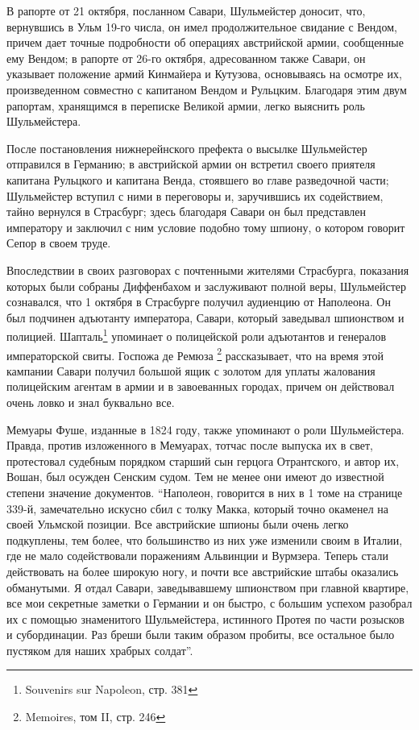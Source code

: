 \documentclass[
  oneside,
  12pt,
  titlepage]{book}
\begin{document}
В рапорте от 21 октября, посланном Савари, Шульмейстер доносит, что, вернувшись в Ульм 19-го числа, он имел продолжительное свидание с Вендом, причем дает точные подробности об операциях австрийской армии, сообщенные ему Вендом; в рапорте от 26-го октября, адресованном также Савари, он указывает положение армий Кинмайера и Кутузова, основываясь на осмотре их, произведенном совместно с капитаном Вендом и Рульцким. Благодаря этим двум рапортам, хранящимся в переписке Великой армии, легко выяснить роль Шульмейстера.

После постановления нижнерейнского префекта о высылке Шульмейстер отправился в Германию; в австрийской армии он встретил своего приятеля капитана Рульцкого и капитана Венда, стоявшего во главе разведочной части; Шульмейстер вступил с ними в переговоры и, заручившись их содействием, тайно вернулся в Страсбург; здесь благодаря Савари он был представлен императору и заключил с ним условие подобно тому шпиону, о котором говорит Сепор в своем труде.

Впоследствии в своих разговорах с почтенными жителями Страсбурга, показания которых были собраны Диффенбахом и заслуживают полной веры, Шульмейстер сознавался, что 1 октября в Страсбурге получил аудиенцию от Наполеона. Он был подчинен адъютанту императора, Савари, который заведывал шпионством и полицией. Шапталь\footnote{Souvenirs sur Napoleon, стр. 381} упоминает о полицейской роли адъютантов и генералов императорской свиты. Госпожа де Ремюза \footnote{Memoires, том II, стр. 246} рассказывает, что на время этой кампании Савари получил большой ящик с золотом для уплаты жалования полицейским агентам в армии и в завоеванных городах, причем он действовал очень ловко и знал буквально все.

Мемуары Фуше, изданные в 1824 году, также упоминают о роли Шульмейстера. Правда, против изложенного в Мемуарах, тотчас после выпуска их в свет, протестовал судебным порядком старший сын герцога Отрантского, и автор их, Вошан, был осужден Сенским судом. Тем не менее они имеют до известной степени значение документов. ``Наполеон, говорится в них в 1 томе на странице 339-й, замечательно искусно сбил с толку Макка, который точно окаменел на своей Ульмской позиции. Все австрийские шпионы были очень легко подкуплены, тем более, что большинство из них уже изменили своим в Италии, где не мало содействовали поражениям Альвинции и Вурмзера. Теперь стали действовать на более широкую ногу, и почти все австрийские штабы оказались обманутыми. Я отдал Савари, заведывавшему шпионством при главной квартире, все мои секретные заметки о Германии и он быстро, с большим успехом разобрал их с помощью знаменитого Шульмейстера, истинного Протея по части розысков и субординации. Раз бреши были таким образом пробиты, все остальное было пустяком для наших храбрых солдат''.
\end{document}
